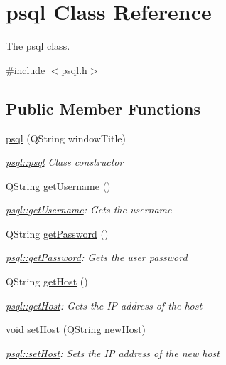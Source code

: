 \hypertarget{classpsql}{}\section{psql Class Reference}
\label{classpsql}


The psql class.  




{\ttfamily \#include $<$psql.\+h$>$}

\subsection*{Public Member Functions}
\begin{DoxyCompactItemize}
\item 
\mbox{\hyperlink{classpsql_aaff5fe0931dce097850982e44e6361af}{psql}} (Q\+String window\+Title)
\begin{DoxyCompactList}\small\item\em \mbox{\hyperlink{classpsql_aaff5fe0931dce097850982e44e6361af}{psql\+::psql}} Class constructor \end{DoxyCompactList}\item 
Q\+String \mbox{\hyperlink{classpsql_aecc9fd93dc5ca0c4f4a63d445a36d166}{get\+Username}} ()
\begin{DoxyCompactList}\small\item\em \mbox{\hyperlink{classpsql_aecc9fd93dc5ca0c4f4a63d445a36d166}{psql\+::get\+Username}}\+: Gets the username \end{DoxyCompactList}\item 
Q\+String \mbox{\hyperlink{classpsql_a817e5a88f877cac6f843c1e743aec096}{get\+Password}} ()
\begin{DoxyCompactList}\small\item\em \mbox{\hyperlink{classpsql_a817e5a88f877cac6f843c1e743aec096}{psql\+::get\+Password}}\+: Gets the user password \end{DoxyCompactList}\item 
Q\+String \mbox{\hyperlink{classpsql_a95d06ee661db0b9cf72605b983b04613}{get\+Host}} ()
\begin{DoxyCompactList}\small\item\em \mbox{\hyperlink{classpsql_a95d06ee661db0b9cf72605b983b04613}{psql\+::get\+Host}}\+: Gets the IP address of the host \end{DoxyCompactList}\item 
void \mbox{\hyperlink{classpsql_a96b3b9483f1a642c026d4b5cf505eb75}{set\+Host}} (Q\+String new\+Host)
\begin{DoxyCompactList}\small\item\em \mbox{\hyperlink{classpsql_a96b3b9483f1a642c026d4b5cf505eb75}{psql\+::set\+Host}}\+: Sets the IP address of the new host \end{DoxyCompactList}\item 

\end{DoxyCompactItemize}
